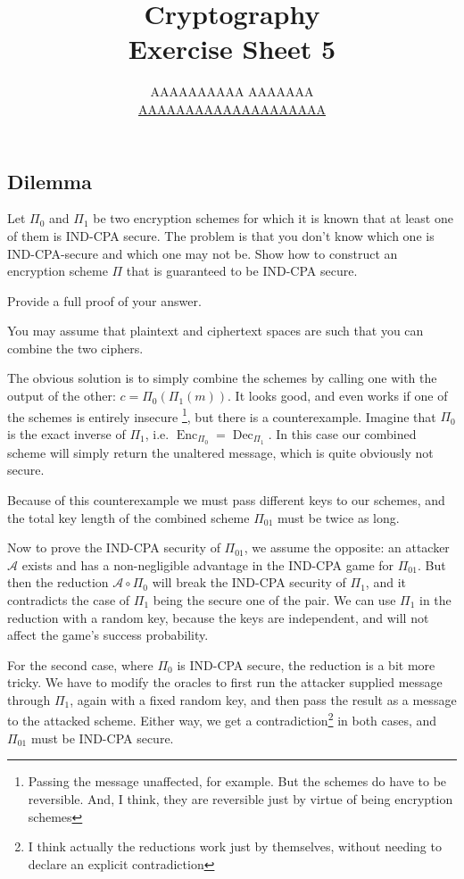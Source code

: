 \documentclass{article}
\title{Cryptography \\ Exercise Sheet 5}
\author{
  AAAAAAAAAA AAAAAAA \\
  \href{mailto:AAAAAAAAAAAAAAAAAAAA}{AAAAAAAAAAAAAAAAAAAA}
}
\begin{document}
  \maketitle

  \setcounter{section}{5}
  \subsection{Dilemma}
  \begin{centerframebox}
    Let $\Pi_0$ and $\Pi_1$ be two encryption schemes for which it is known that at
    least one of them is IND-CPA secure. The problem is that you don't know
    which one is IND-CPA-secure and which one may not be. Show how to
    construct an encryption scheme $\Pi$ that is guaranteed to be IND-CPA secure.

    Provide a full proof of your answer.

    You may assume that plaintext and ciphertext spaces are such that you can
    combine the two ciphers.
  \end{centerframebox}
  The obvious solution is to simply combine the schemes by calling one with the output of the other: $c = \Pi_0(\Pi_1(m))$.
  It looks good, and even works if one of the schemes is entirely insecure%
  \footnote{Passing the message unaffected, for example. But the schemes do have to be reversible. And, I think, they are reversible just by virtue of being encryption schemes},
  but there is a counterexample.
  Imagine that $\Pi_0$ is the exact inverse of $\Pi_1$, i.e. $\operatorname{Enc}_{\Pi_0} = \operatorname{Dec}_{\Pi_1}$.
  In this case our combined scheme will simply return the unaltered message, which is quite obviously not secure.

  Because of this counterexample we must pass different keys to our schemes,
  and the total key length of the combined scheme $\Pi_{01}$ must be twice as long.

  Now to prove the IND-CPA security of $\Pi_{01}$, we assume the opposite:
  an attacker $\mathcal{A}$ exists and has a non-negligible advantage in the IND-CPA game for $\Pi_{01}$.
  But then the reduction $\mathcal{A} \circ \Pi_0$ will break the IND-CPA security of $\Pi_1$,
  and it contradicts the case of $\Pi_1$ being the secure one of the pair.
  We can use $\Pi_1$ in the reduction with a random key, because the keys are independent,
  and will not affect the game's success probability.

  For the second case, where $\Pi_0$ is IND-CPA secure, the reduction is a bit more tricky.
  We have to modify the oracles to first run the attacker supplied message through $\Pi_1$,
  again with a fixed random key, and then pass the result as a message to the attacked scheme.
  Either way, we get a contradiction\footnote{I think actually the reductions work just by themselves, without needing to declare an explicit contradiction} in both cases, and $\Pi_{01}$ must be IND-CPA secure.
\end{document}
